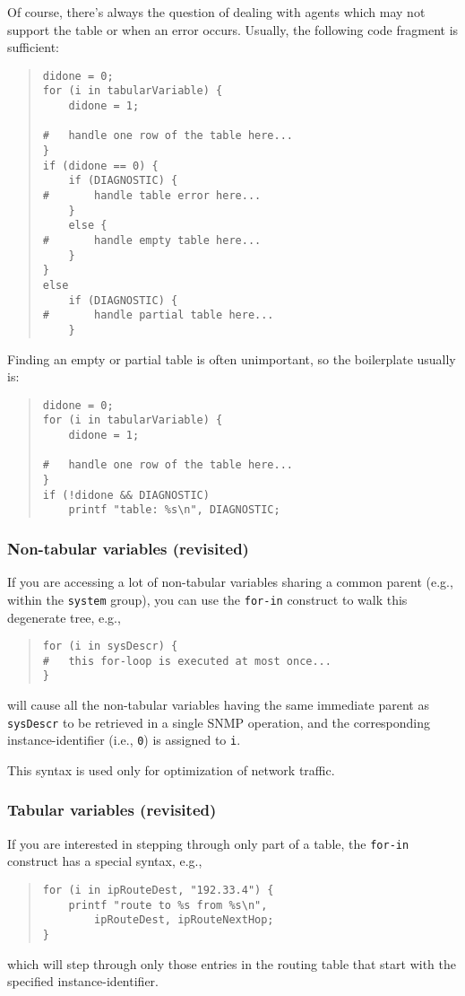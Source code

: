 Of course,
there's always the question of dealing with agents which may not support the
table or when an error occurs.
Usually, the following code fragment is sufficient:
\begin{quote}\small\begin{verbatim}
didone = 0;
for (i in tabularVariable) {
    didone = 1;

#   handle one row of the table here...
}
if (didone == 0) {
    if (DIAGNOSTIC) {
#       handle table error here...
    }
    else {
#       handle empty table here...
    }
}
else
    if (DIAGNOSTIC) {
#       handle partial table here...
    }
\end{verbatim}\end{quote}
Finding an empty or partial table is often unimportant,
so the boilerplate usually is:
\begin{quote}\small\begin{verbatim}
didone = 0;
for (i in tabularVariable) {
    didone = 1;

#   handle one row of the table here...
}
if (!didone && DIAGNOSTIC)
    printf "table: %s\n", DIAGNOSTIC;
\end{verbatim}\end{quote}

\subsubsection*	{Non-tabular variables (revisited)}
If you are accessing a lot of non-tabular variables sharing a common parent
(e.g., within the \verb"system" group),
you can use the \verb"for-in" construct to walk this degenerate tree,
e.g.,
\begin{quote}\small\begin{verbatim}
for (i in sysDescr) {
#   this for-loop is executed at most once...
}
\end{verbatim}\end{quote}
will cause all the non-tabular variables having the same immediate parent as
\verb"sysDescr" to be retrieved in a single SNMP operation,
and the corresponding instance-identifier (i.e., \verb"0") is assigned to
\verb"i".

This syntax is used only for optimization of network traffic.

\subsubsection*	{Tabular variables (revisited)}
If you are interested in stepping through only part of a table,
the \verb"for-in" construct has a special syntax,
e.g.,
\begin{quote}\small\begin{verbatim}
for (i in ipRouteDest, "192.33.4") {
    printf "route to %s from %s\n",
        ipRouteDest, ipRouteNextHop;
}
\end{verbatim}\end{quote}
which will step through only those entries in the routing table that start
with the specified instance-identifier.

